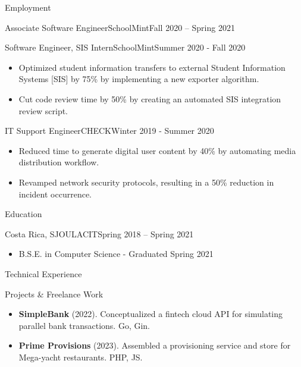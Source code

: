 \documentclass[]{mcdowellcv}
\begin{document}
\begin{cvsection}{Employment}
\begin{cvsubsection}{Associate Software Engineer}{SchoolMint}{Fall 2020 -- Spring 2021}
		\end{cvsubsection}
		\begin{cvsubsection}{Software Engineer, SIS Intern}{SchoolMint}{Summer 2020 - Fall 2020}
			\begin{itemize}
				\item Optimized student information transfers to external Student Information Systems [SIS] by 75\% by implementing a new exporter algorithm.
				\item Cut code review time by 50\% by creating an automated SIS integration review script.
			\end{itemize}
		\end{cvsubsection}
		\begin{cvsubsection}{IT Support Engineer}{CHECK}{Winter 2019 - Summer 2020}
			\begin{itemize}
				\item Reduced time to generate digital user content by 40\% by automating media distribution workflow.
				\item Revamped network security protocols, resulting in a 50\% reduction in incident occurrence.
			\end{itemize}
		\end{cvsubsection}
	\end{cvsection}
	\begin{cvsection}{Education}
		\begin{cvsubsection}{Costa Rica, SJO}{ULACIT}{Spring 2018 -- Spring 2021}
			\begin{itemize}
				\item B.S.E. in Computer Science - Graduated Spring 2021
			\end{itemize}
		\end{cvsubsection}
	\end{cvsection}
	\begin{cvsection}{Technical Experience}
		\begin{cvsubsection}{Projects \& Freelance Work}{}{}
			\begin{itemize}
				\item \textbf{SimpleBank} (2022). Conceptualized a fintech cloud API for simulating parallel bank transactions. Go, Gin.
			\end{itemize}
			\begin{itemize}
				\item \textbf{Prime Provisions} (2023). Assembled a provisioning service and store for Mega-yacht restaurants. PHP, JS.
			\end{itemize}
		\end{cvsubsection}
	\end{cvsection}
\end{document}
